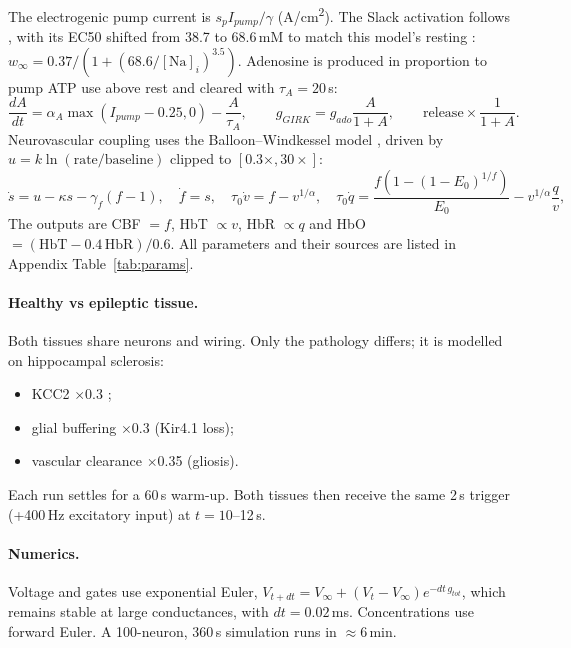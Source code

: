 The electrogenic pump current is $s_p I_{pump}/\gamma$ (\textmu A/cm\textsuperscript{2}). The Slack activation follows \cite{compte2003}, with its EC50 shifted from 38.7 to 68.6\,mM to match this model's resting \Nai: $w_\infty = 0.37/(1+(68.6/[\mathrm{Na}]_i)^{3.5})$. Adenosine is produced in proportion to pump ATP use above rest and cleared with $\tau_A=20$\,s:
\begin{equation}
\frac{dA}{dt} = \alpha_A\max(I_{pump}-0.25,0) - \frac{A}{\tau_A},\qquad g_{GIRK} = g_{ado}\frac{A}{1+A},\qquad \text{release}\times\frac{1}{1+A}.
\end{equation}
Neurovascular coupling uses the Balloon--Windkessel model \cite{buxton1998,friston2000}, driven by $u = k\ln(\mathrm{rate}/\mathrm{baseline})$ clipped to $[0.3\times,30\times]$:
\begin{equation}
\dot s = u - \kappa s - \gamma_f(f-1),\quad \dot f = s,\quad \tau_0\dot v = f - v^{1/\alpha},\quad
\tau_0\dot q = \frac{f(1-(1-E_0)^{1/f})}{E_0} - v^{1/\alpha}\frac{q}{v},
\end{equation}
The outputs are CBF $=f$, HbT $\propto v$, HbR $\propto q$ and HbO $=(\mathrm{HbT}-0.4\,\mathrm{HbR})/0.6$. All parameters and their sources are listed in Appendix Table~\ref{tab:params}.

\paragraph{Healthy vs epileptic tissue.} Both tissues share neurons and wiring. Only the pathology differs; it is modelled on hippocampal sclerosis:
\begin{itemize}
\item KCC2 $\times$0.3 \cite{doyon2016};
\item glial \Kp{} buffering $\times$0.3 (Kir4.1 loss);
\item vascular \Kp{} clearance $\times$0.35 (gliosis).
\end{itemize}
Each run settles for a 60\,s warm-up. Both tissues then receive the same 2\,s trigger (+400\,Hz excitatory input) at $t=10$--12\,s.

\paragraph{Numerics.} Voltage and gates use exponential Euler, $V_{t+dt} = V_\infty + (V_t - V_\infty)e^{-dt\,g_{tot}}$, which remains stable at large conductances, with $dt=0.02$\,ms. Concentrations use forward Euler. A 100-neuron, 360\,s simulation runs in $\approx$6\,min.

